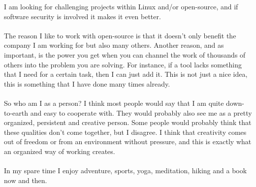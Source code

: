 I am looking for challenging projects within Linux and/or open-source, and if software security is involved it makes it even better.\\\\
The reason I like to work with open-source is that it doesn't only benefit the company I am working for but also many others. Another reason, and as important, is the power you get when you can channel the work of thousands of others into the problem you are solving. For instance, if a tool lacks something that I need for a certain task, then I can just add it. This is not just a nice idea, this is something that I have done many times already.\\\\
So who am I as a person? I think most people would say that I am quite down-to-earth and easy to cooperate with. They would probably also see me as a pretty organized, persistent and creative person. Some people would probably think that these qualities don't come together, but I disagree. I think that creativity comes out of freedom or from an environment without pressure, and this is exactly what an organized way of working creates.\\\\
In my spare time I enjoy adventure, sports, yoga, meditation, hiking and a book now and then.